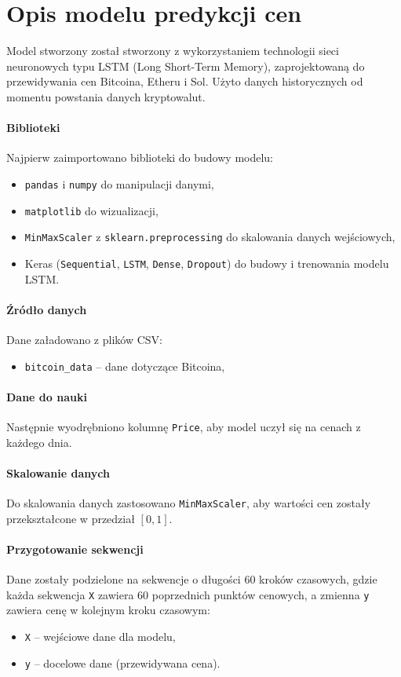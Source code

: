 \section{Opis modelu predykcji cen}
Model stworzony został stworzony z wykorzystaniem technologii sieci neuronowych typu LSTM (Long Short-Term Memory), zaprojektowaną do przewidywania cen Bitcoina, Etheru i Sol. Użyto danych historycznych od momentu powstania danych kryptowalut.

\paragraph{Biblioteki}
Najpierw zaimportowano biblioteki do budowy modelu:

\begin{itemize}
    \item \texttt{pandas} i \texttt{numpy} do manipulacji danymi,
    \item \texttt{matplotlib} do wizualizacji,
    \item \texttt{MinMaxScaler} z \texttt{sklearn.preprocessing} do skalowania danych wejściowych,
    \item Keras (\texttt{Sequential}, \texttt{LSTM}, \texttt{Dense}, \texttt{Dropout}) do budowy i trenowania modelu LSTM.
\end{itemize}

\paragraph{Źródło danych}
Dane załadowano z plików CSV:

\begin{itemize}
    \item \texttt{bitcoin\_data} – dane dotyczące Bitcoina,
\end{itemize}

\paragraph{Dane do nauki}
Następnie wyodrębniono kolumnę \texttt{Price}, aby model uczył się na cenach z każdego dnia.

\paragraph{Skalowanie danych}
Do skalowania danych zastosowano \texttt{MinMaxScaler}, aby wartości cen zostały przekształcone w przedział \([0, 1]\).


\paragraph{Przygotowanie sekwencji}
Dane zostały podzielone na sekwencje o długości 60 kroków czasowych, gdzie każda sekwencja \texttt{X} zawiera 60 poprzednich punktów cenowych, a zmienna \texttt{y} zawiera cenę w kolejnym kroku czasowym:
\begin{itemize}
    \item \texttt{X} – wejściowe dane dla modelu,
    \item \texttt{y} – docelowe dane (przewidywana cena).
\end{itemize}

